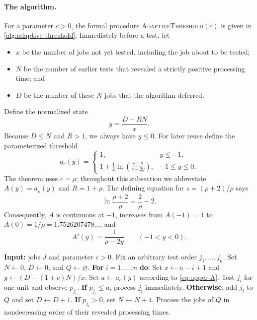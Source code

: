 \paragraph{The algorithm.}
For a parameter $c>0$, the formal procedure
\textsc{AdaptiveThreshold}$(c)$ is given in
\cref{alg:adaptive-threshold}.  Immediately before a test, let
\begin{itemize}
\item $x$ be the number of jobs not yet tested, including the job about to be
      tested;
\item $N$ be the number of earlier tests that revealed a strictly positive
      processing time; and
\item $D$ be the number of these $N$ jobs that the algorithm deferred.
\end{itemize}
Define the normalized state
\begin{equation}
\label{eq:upper-y}
 y=\frac{D-RN}{x}.
\end{equation}
Because $D\le N$ and $R>1$, we always have $y\le0$.  For later reuse define
the parameterized threshold
\begin{equation}
\label{eq:upper-A}
 a_c(y)=
 \begin{cases}
  1, & y\le-1,\\[1mm]
  \displaystyle
  1+\frac12\ln\!\left(\frac{c+2}{c-2y}\right),
       & -1\le y\le0.
 \end{cases}
\end{equation}
The theorem uses $c=\rho$; throughout this subsection we abbreviate
$A(y)=a_\rho(y)$ and $R=1+\rho$.
The defining equation for $z=(\rho+2)/\rho$ says
\begin{equation}
\label{eq:upper-root-rho}
 \ln\frac{\rho+2}{\rho}=\frac2\rho-2.
\end{equation}
Consequently, $A$ is continuous at $-1$, increases from $A(-1)=1$ to
$A(0)=1/\rho=1.7526207478\ldots$, and
\begin{equation}
\label{eq:upper-A-prime}
 A'(y)=\frac{1}{\rho-2y}
 \qquad (-1<y<0).
\end{equation}

\begin{algorithm}[H]
\caption{\textsc{AdaptiveThreshold}$(J,c)$}
\label{alg:adaptive-threshold}
\begin{algorithmic}
\Statex \textbf{Input:} jobs $J$ and parameter $c>0$.
\State Fix an arbitrary test order $j_1,\ldots,j_n$.
\State Set $N\gets0$, $D\gets0$, and $Q\gets\varnothing$.
\State \textbf{For} $i=1,\ldots,n$ \textbf{do}:
\State \quad Set $x\gets n-i+1$ and $y\gets(D-(1+c)N)/x$.
\State \quad Set $a\gets a_c(y)$ according to \cref{eq:upper-A}.
\State \quad Test $j_i$ for one unit and observe $p_{j_i}$.
\State \quad \textbf{If} $p_{j_i}\le a$, process $j_i$ immediately.
\State \quad \textbf{Otherwise}, add $j_i$ to $Q$ and set $D\gets D+1$.
\State \quad \textbf{If} $p_{j_i}>0$, set $N\gets N+1$.
\State Process the jobs of $Q$ in nondecreasing order of their revealed
       processing times.
\end{algorithmic}
\end{algorithm}

